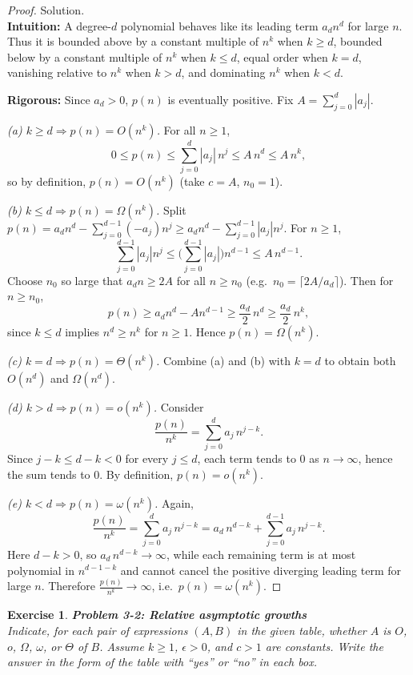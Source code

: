 \documentclass[12pt]{article}
\newtheorem{exercise}[theorem]{Exercise}
\theoremstyle{definition}
\begin{document}
\begin{proof}
Solution. \\

\noindent
\textbf{Intuition:}
A degree-$d$ polynomial behaves like its leading term $a_d n^d$ for large $n$. 
Thus it is bounded above by a constant multiple of $n^k$ when $k\ge d$, bounded below by a constant multiple of $n^k$ when $k\le d$, equal order when $k=d$, vanishing relative to $n^k$ when $k>d$, and dominating $n^k$ when $k<d$.

\noindent
\textbf{Rigorous:} 
Since $a_d>0$, $p(n)$ is eventually positive. Fix $A=\sum_{j=0}^d |a_j|$.

\medskip
\emph{(a) $k\ge d \Rightarrow p(n)=O(n^k)$.}
For all $n\ge 1$,
\[
0\le p(n)\le \sum_{j=0}^d |a_j|\,n^j \le A\,n^d \le A\,n^k,
\]
so by definition, $p(n)=O(n^k)$ (take $c=A$, $n_0=1$).

\medskip
\emph{(b) $k\le d \Rightarrow p(n)=\Omega(n^k)$.}
Split $p(n)=a_d n^d - \sum_{j=0}^{d-1} (-a_j) n^j \ge a_d n^d - \sum_{j=0}^{d-1} |a_j| n^j$.
For $n\ge 1$,
\[
\sum_{j=0}^{d-1} |a_j| n^j \le \Big(\sum_{j=0}^{d-1} |a_j|\Big) n^{d-1} \le A\,n^{d-1}.
\]
Choose $n_0$ so large that $a_d n \ge 2A$ for all $n\ge n_0$ (e.g.\ $n_0=\lceil 2A/a_d\rceil$). Then for $n\ge n_0$,
\[
p(n)\ge a_d n^d - A n^{d-1} \ge \frac{a_d}{2}\,n^d \ge \frac{a_d}{2}\,n^k,
\]
since $k\le d$ implies $n^d\ge n^k$ for $n\ge 1$. Hence $p(n)=\Omega(n^k)$.

\medskip
\emph{(c) $k=d \Rightarrow p(n)=\Theta(n^k)$.}
Combine (a) and (b) with $k=d$ to obtain both $O(n^d)$ and $\Omega(n^d)$.

\medskip
\emph{(d) $k>d \Rightarrow p(n)=o(n^k)$.}
Consider
\[
\frac{p(n)}{n^k}=\sum_{j=0}^d a_j\,n^{j-k}.
\]
Since $j-k\le d-k<0$ for every $j\le d$, each term tends to $0$ as $n\to\infty$, hence the sum tends to $0$. By definition, $p(n)=o(n^k)$.

\medskip
\emph{(e) $k<d \Rightarrow p(n)=\omega(n^k)$.}
Again,
\[
\frac{p(n)}{n^k}=\sum_{j=0}^d a_j\,n^{j-k}=a_d\,n^{d-k}+\sum_{j=0}^{d-1} a_j\,n^{j-k}.
\]
Here $d-k>0$, so $a_d\,n^{d-k}\to\infty$, while each remaining term is at most polynomial in $n^{d-1-k}$ and cannot cancel the positive diverging leading term for large $n$. Therefore $\frac{p(n)}{n^k}\to\infty$, i.e.\ $p(n)=\omega(n^k)$.
\end{proof}

\newpage

\begin{exercise}
\noindent
\textbf{Problem 3-2: Relative asymptotic growths} \\
Indicate, for each pair of expressions $(A,B)$ in the given table, whether $A$ is
$O$, $o$, $\Omega$, $\omega$, or $\Theta$ of $B$. Assume $k \ge 1$, $\epsilon > 0$, and $c>1$ are constants.
Write the answer in the form of the table with “yes” or “no” in each box.
\end{exercise}
\end{document}
